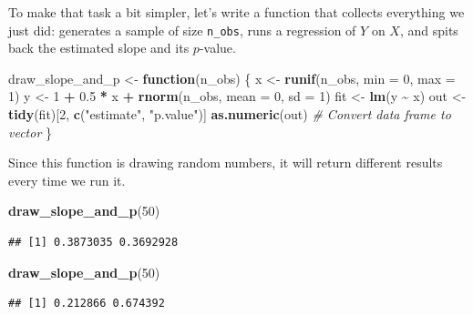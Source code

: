 \documentclass[
  12pt,
  oneside,openany]{book}
\newenvironment{Shaded}{\begin{snugshade}}{\end{snugshade}}
\newcommand{\CommentTok}[1]{\textcolor[rgb]{0.56,0.35,0.01}{\textit{#1}}}
\newcommand{\ControlFlowTok}[1]{\textcolor[rgb]{0.13,0.29,0.53}{\textbf{#1}}}
\newcommand{\DataTypeTok}[1]{\textcolor[rgb]{0.13,0.29,0.53}{#1}}
\newcommand{\DecValTok}[1]{\textcolor[rgb]{0.00,0.00,0.81}{#1}}
\newcommand{\FloatTok}[1]{\textcolor[rgb]{0.00,0.00,0.81}{#1}}
\newcommand{\KeywordTok}[1]{\textcolor[rgb]{0.13,0.29,0.53}{\textbf{#1}}}
\newcommand{\NormalTok}[1]{#1}
\newcommand{\OperatorTok}[1]{\textcolor[rgb]{0.81,0.36,0.00}{\textbf{#1}}}
\newcommand{\StringTok}[1]{\textcolor[rgb]{0.31,0.60,0.02}{#1}}
\begin{document}
To make that task a bit simpler, let's write a function that collects everything we just did: generates a sample of size \texttt{n\_obs}, runs a regression of \(Y\) on \(X\), and spits back the estimated slope and its \(p\)-value.

\begin{Shaded}
\begin{Highlighting}[]
\NormalTok{draw\_slope\_and\_p \textless{}{-}}\StringTok{ }\ControlFlowTok{function}\NormalTok{(n\_obs) \{}
\NormalTok{    x \textless{}{-}}\StringTok{ }\KeywordTok{runif}\NormalTok{(n\_obs, }\DataTypeTok{min =} \DecValTok{0}\NormalTok{, }\DataTypeTok{max =} \DecValTok{1}\NormalTok{)}
\NormalTok{    y \textless{}{-}}\StringTok{ }\DecValTok{1} \OperatorTok{+}\StringTok{ }\FloatTok{0.5} \OperatorTok{*}\StringTok{ }\NormalTok{x }\OperatorTok{+}\StringTok{ }\KeywordTok{rnorm}\NormalTok{(n\_obs, }\DataTypeTok{mean =} \DecValTok{0}\NormalTok{, }\DataTypeTok{sd =} \DecValTok{1}\NormalTok{)}
\NormalTok{    fit \textless{}{-}}\StringTok{ }\KeywordTok{lm}\NormalTok{(y }\OperatorTok{\textasciitilde{}}\StringTok{ }\NormalTok{x)}
\NormalTok{    out \textless{}{-}}\StringTok{ }\KeywordTok{tidy}\NormalTok{(fit)[}\DecValTok{2}\NormalTok{, }\KeywordTok{c}\NormalTok{(}\StringTok{"estimate"}\NormalTok{, }\StringTok{"p.value"}\NormalTok{)]}
    \KeywordTok{as.numeric}\NormalTok{(out)  }\CommentTok{\# Convert data frame to vector}
\NormalTok{\}}
\end{Highlighting}
\end{Shaded}

Since this function is drawing random numbers, it will return different results every time we run it.

\begin{Shaded}
\begin{Highlighting}[]
\KeywordTok{draw\_slope\_and\_p}\NormalTok{(}\DecValTok{50}\NormalTok{)}
\end{Highlighting}
\end{Shaded}

\begin{verbatim}
## [1] 0.3873035 0.3692928
\end{verbatim}

\begin{Shaded}
\begin{Highlighting}[]
\KeywordTok{draw\_slope\_and\_p}\NormalTok{(}\DecValTok{50}\NormalTok{)}
\end{Highlighting}
\end{Shaded}

\begin{verbatim}
## [1] 0.212866 0.674392
\end{verbatim}
\end{document}
